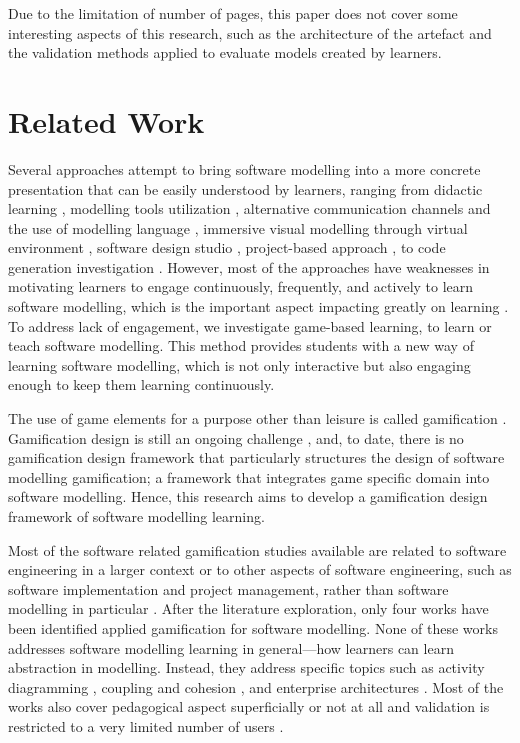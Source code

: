 \documentclass[runningheads,a4paper]{llncs}
\begin{document}
Due to the limitation of number of pages, this paper does not cover some interesting aspects of this research, such as the architecture of the artefact and the validation methods applied to evaluate models created by learners. 

\section{Related Work}
Several approaches attempt to bring software modelling into a more concrete presentation that can be easily understood by learners, ranging from didactic learning \cite{moisan2009teaching}, modelling tools utilization \cite{Akayama2013}, alternative communication channels and the use of modelling language \cite{Brandsteidl2011}, immersive visual modelling through virtual environment \cite{neubauer2003immersive}, software design studio \cite{Whittle2014}, project-based approach \cite{Szmurlo2007}, to code generation investigation \cite{schmidt2014teaching}. However, most of the approaches have weaknesses in motivating learners to engage continuously, frequently, and actively to learn software modelling, which is the important aspect impacting greatly on learning \cite{Naps2005}. To address lack of engagement, we investigate game-based learning, to learn or teach software modelling. This method provides students with a new way of learning software modelling, which is not only interactive but also engaging enough to keep them learning continuously. 

The use of game elements for a purpose other than leisure is called gamification \cite{deterding2011game}. Gamification design is still an ongoing challenge \cite{Deterding2013}, and, to date, there is no gamification design framework that particularly structures the design of software modelling gamification; a framework that integrates game specific domain into software modelling. Hence, this research aims to develop a gamification design framework of software modelling learning.

Most of the software related gamification studies available are related to software engineering in a larger context or to other aspects of software engineering, such as software implementation and project management, rather than software modelling in particular \cite{Pedreira2015}. After the literature exploration, only four works have been identified applied gamification for software modelling. None of these works addresses software modelling learning in general---how learners can learn abstraction in modelling. Instead, they address specific topics such as activity diagramming \cite{Richardsen2014}, coupling and cohesion \cite{Stikkolorum2014}, and enterprise architectures \cite{Groenewegen2010} \cite{Ionita2015}. Most of the works also cover pedagogical aspect superficially or not at all and validation is restricted to a very limited number of users \cite{Richardsen2014}\cite{Stikkolorum2014}\cite{Groenewegen2010}.
\end{document}
